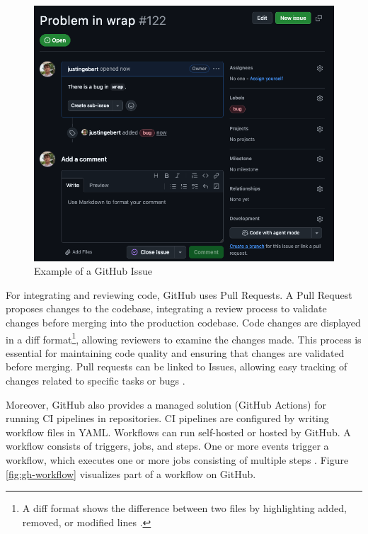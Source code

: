 \begin{figure}[H]
    \centering
    \includegraphics[width=1\textwidth]{images/github/github_issue.png}
    \caption{Example of a GitHub Issue}
    \label{fig:gh-issue}
\end{figure}

For integrating and reviewing code, GitHub uses Pull Requests. A Pull Request proposes changes to the codebase, integrating a review process to validate changes before merging into the production codebase. Code changes are displayed in a diff format\footnote{A diff format shows the difference between two files by highlighting added, removed, or modified lines \cite{WhatDiffUnderstanding}.}, allowing reviewers to examine the changes made. This process is essential for maintaining code quality and ensuring that changes are validated before merging. Pull requests can be linked to Issues, allowing easy tracking of changes related to specific tasks or bugs \cite{PullRequests}.

Moreover, GitHub also provides a managed solution (GitHub Actions) for running CI pipelines in repositories. CI pipelines are configured by writing workflow files in YAML. Workflows can run self-hosted or hosted by GitHub. A workflow consists of triggers, jobs, and steps. One or more events trigger a workflow, which executes one or more jobs consisting of multiple steps \cite{UnderstandingGitHubActions}. Figure \ref{fig:gh-workflow} visualizes part of a workflow on GitHub.

